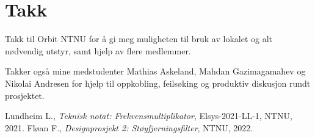 \documentclass[a4paper,11pt,norsk]{article}
\begin{document}
\section{Takk}

Takk til Orbit NTNU for å gi meg muligheten til bruk av lokalet og alt nødvendig utstyr, samt hjelp av flere medlemmer. 

Takker også mine medstudenter Mathias Askeland, Mahdan Gazimagamahev og Nikolai Andresen for hjelp til oppkobling, feilsøking og produktiv diskusjon rundt prosjektet.

{}

\begin{thebibliography}{99}
        Lundheim L., 
        \textit{Teknisk notat: Frekvensmultiplikator}, 
    	Elsys-2021-LL-1, 
    	NTNU,
    	2021.
        Fløan F., 
        \textit{Designprosjekt 2: Støyfjerningsfilter}, 
    	NTNU,
    	2022.
\end{thebibliography}
\end{document}
